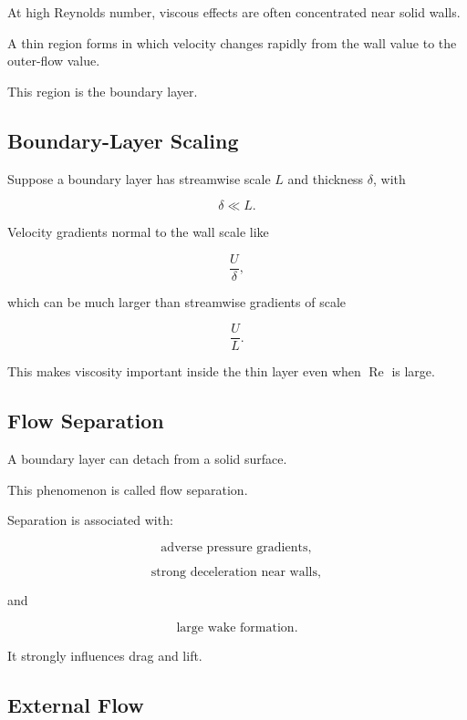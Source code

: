 At high Reynolds number, viscous effects are often concentrated near solid
walls.

A thin region forms in which velocity changes rapidly from the wall value to
the outer-flow value.

This region is the boundary layer.

\subsection{Boundary-Layer Scaling}
\label{subsec:boundary-layer-scaling}

Suppose a boundary layer has streamwise scale \(L\) and thickness \(\delta\),
with

\[
\delta\ll L.
\]

Velocity gradients normal to the wall scale like

\[
\boxed{
\frac{U}{\delta},
}
\]

which can be much larger than streamwise gradients of scale

\[
\boxed{
\frac{U}{L}.
}
\]

This makes viscosity important inside the thin layer even when
\(\operatorname{Re}\) is large.

\subsection{Flow Separation}
\label{subsec:flow-separation}

A boundary layer can detach from a solid surface.

This phenomenon is called flow separation.

Separation is associated with:

\[
\boxed{
\text{adverse pressure gradients},
}
\]

\[
\boxed{
\text{strong deceleration near walls},
}
\]

and

\[
\boxed{
\text{large wake formation}.
}
\]

It strongly influences drag and lift.

\subsection{External Flow}
\label{subsec:external-flow}

